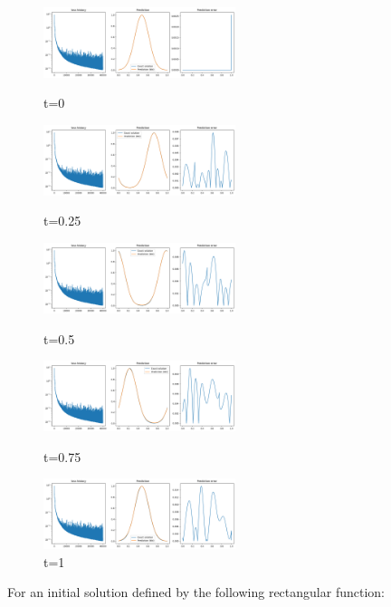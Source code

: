 \documentclass{article}
\begin{document}
\begin{figure}[!h]
    \centering
    \includegraphics[width=0.5\textwidth]{images/r1.png}
    \caption{t=0}
    \includegraphics[width=0.5\textwidth]{images/r2.png}
    \caption{t=0.25}
    \includegraphics[width=0.5\textwidth]{images/r3.png}
    \caption{t=0.5}
    \includegraphics[width=0.5\textwidth]{images/r4.png}
    \caption{t=0.75}
    \includegraphics[width=0.5\textwidth]{images/r5.png}
    \caption{t=1}
\end{figure} 

For an initial solution defined by the following rectangular function:
\end{document}
